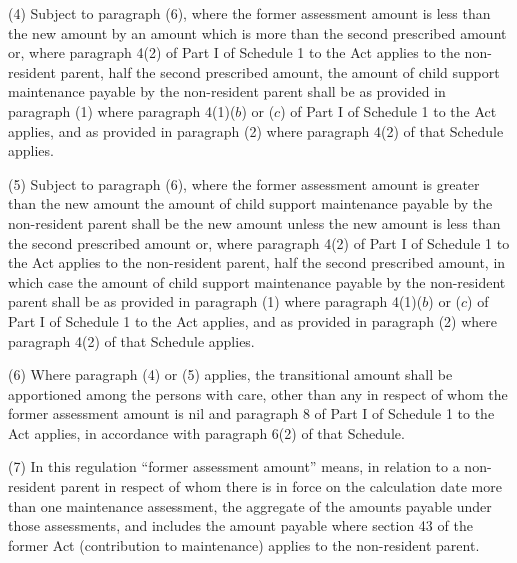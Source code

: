 \documentclass[12pt,a4paper]{article}
\begin{document}
(4) Subject to paragraph (6), where the former assessment amount is less than the new amount by an amount which is more than the second prescribed amount or, where paragraph 4(2) of Part I of Schedule 1 to the Act applies to the non-resident parent, half the second prescribed amount, the amount of child support maintenance payable by the non-resident parent shall be as provided in paragraph (1) where paragraph 4(1)($b$)  
or ($c$)  %
of Part I of Schedule 1 to the Act applies, and as provided in paragraph (2) where paragraph 4(2) of that Schedule applies.

(5) Subject to paragraph (6), where the former assessment amount is greater than the new amount the amount of child support maintenance payable by the non-resident parent shall be the new amount unless the new amount is less than the second prescribed amount or, where paragraph 4(2) of Part I of Schedule 1 to the Act applies to the non-resident parent, half the second prescribed amount, in which case the amount of child support maintenance payable by the non-resident parent shall be as provided in paragraph (1) where paragraph 4(1)($b$)  
or ($c$)  %
of Part I of Schedule 1 to the Act applies, and as provided in paragraph (2) where paragraph 4(2) of that Schedule applies.


(6) Where paragraph (4) or (5) applies, the transitional amount shall be apportioned among the persons with care, other than any in respect of whom the former assessment amount is nil and paragraph 8 of Part I of Schedule 1 to the Act applies, in accordance with paragraph 6(2) of that Schedule.

(7) In this regulation “former assessment amount” means, in relation to a non-resident parent in respect of whom there is in force on the calculation date more than one maintenance assessment, the aggregate of the amounts payable under those assessments, and 
includes the amount payable where section 43 of the former Act (contribution to maintenance) applies to the non-resident parent.
\end{document}
